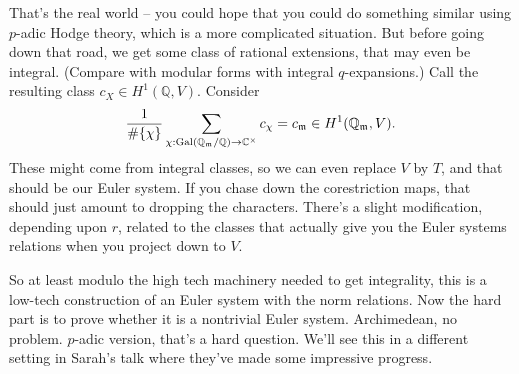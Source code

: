 \documentclass[reqno]{amsart} 
\begin{document}
That's the real world -- you could hope that you could do something similar using $p$-adic Hodge theory, which is a more complicated situation.  But before going down that road, we get some class of rational extensions, that may even be integral.  (Compare with modular forms with integral $q$-expansions.)  Call the resulting class $c_X \in H^1(\mathbb{Q}, V)$.  Consider
\begin{equation*}
  \frac{1}{\# \{\chi\}}
  \sum_{\chi : \operatorname{Gal}(\mathbb{Q}_{\mathfrak{m}} / \mathbb{Q}) \rightarrow \mathbb{C}^\times}
  c_\chi = c_{\mathfrak{m}} \in H^1(\mathbb{Q}_{\mathfrak{m}}, V).
\end{equation*}
These might come from integral classes, so we can even replace $V$ by $T$, and that should be our Euler system.  If you chase down the corestriction maps, that should just amount to dropping the characters.  There's a slight modification, depending upon $r$, related to the classes that actually give you the Euler systems relations when you project down to $V$.

So at least modulo the high tech machinery needed to get integrality, this is a low-tech construction of an Euler system with the norm relations.  Now the hard part is to prove whether it is a nontrivial Euler system.  Archimedean, no problem.  $p$-adic version, that's a hard question.  We'll see this in a different setting in Sarah's talk where they've made some impressive progress.
\end{document}
